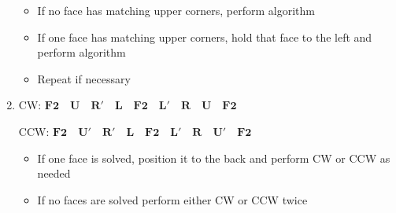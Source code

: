 \documentclass{article}
\begin{document}
\begin{enumerate}
\begin{itemize}
                  \item If no face has matching upper corners, perform algorithm
                  \item If one face has matching upper corners, hold that face to the left and perform algorithm
                  \item Repeat if necessary
              \end{itemize}
        \item CW: $\mathbf{F2\quad
               U\quad
               R'\quad
               L\quad
               F2\quad
               L'\quad
               R\quad
               U\quad
               F2\quad}$

              CCW: $\mathbf{F2\quad
               U'\quad
               R'\quad
               L\quad
               F2\quad
               L'\quad
               R\quad
               U'\quad
               F2\quad}$
              \begin{itemize}
                  \item If one face is solved, position it to the back and perform CW or CCW as needed
                  \item If no faces are solved perform either CW or CCW twice
              \end{itemize}
    \end{enumerate}
\end{document}
